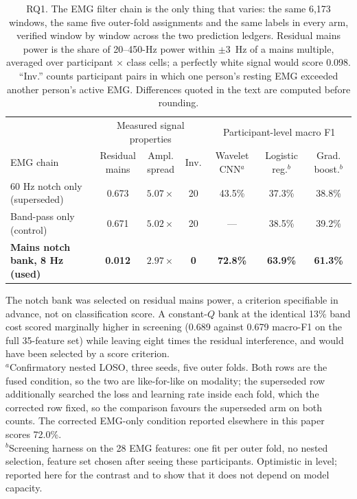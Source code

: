 \documentclass[pdflatex,sn-nature,iicol]{sn-jnl}
\begin{document}
\begin{table}[t]
  \centering
  \caption{RQ1. The EMG filter chain is the only thing that varies: the same 6,173 windows, the same five outer-fold assignments and the same labels in every arm, verified window by window across the two prediction ledgers. Residual mains power is the share of 20--450-Hz power within $\pm3$~Hz of a mains multiple, averaged over participant $\times$ class cells; a perfectly white signal would score 0.098. ``Inv.'' counts participant pairs in which one person's resting EMG exceeded another person's active EMG. Differences quoted in the text are computed before rounding.}
  \label{tab:filter}
  \footnotesize
  \begin{tabular*}{\textwidth}{@{\extracolsep{\fill}}lcccccc@{}}
    \toprule
    & \multicolumn{3}{c}{Measured signal properties} & \multicolumn{3}{c}{Participant-level macro F1} \\
    \cmidrule(lr){2-4}\cmidrule(lr){5-7}
    EMG chain & \shortstack{Residual\\mains} & \shortstack{Ampl.\\spread} & Inv. & \shortstack{Wavelet\\CNN$^{a}$} & \shortstack{Logistic\\reg.$^{b}$} & \shortstack{Grad.\\boost.$^{b}$} \\
    \midrule
    60 Hz notch only (superseded) & 0.673 & $5.07\times$ & 20 & 43.5\% & 37.3\% & 38.8\% \\
    Band-pass only (control) & 0.671 & $5.02\times$ & 20 & --- & 38.5\% & 39.2\% \\
    \midrule
    \textbf{Mains notch bank, 8 Hz (used)} & \textbf{0.012} & $\mathbf{2.97\times}$ & \textbf{0} & \textbf{72.8\%} & \textbf{63.9\%} & \textbf{61.3\%} \\
    \bottomrule
  \end{tabular*}
  \begin{flushleft}\footnotesize
  The notch bank was selected on residual mains power, a criterion specifiable in advance, not on classification score. A constant-$Q$ bank at the identical 13\% band cost scored marginally higher in screening (0.689 against 0.679 macro-F1 on the full 35-feature set) while leaving eight times the residual interference, and would have been selected by a score criterion.\\
  $^{a}$Confirmatory nested LOSO, three seeds, five outer folds. Both rows are the fused condition, so the two are like-for-like on modality; the superseded row additionally searched the loss and learning rate inside each fold, which the corrected row fixed, so the comparison favours the superseded arm on both counts. The corrected EMG-only condition reported elsewhere in this paper scores 72.0\%.\\
  $^{b}$Screening harness on the 28 EMG features: one fit per outer fold, no nested selection, feature set chosen after seeing these participants. Optimistic in level; reported here for the contrast and to show that it does not depend on model capacity.
  \end{flushleft}
\end{table}
\end{document}
